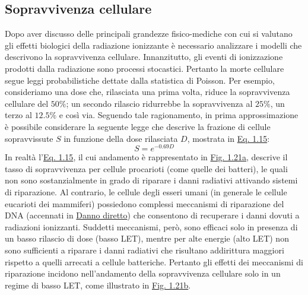 \documentclass[12pt,a4paper,twoside]{report}
\begin{document}
	\subsection{Sopravvivenza cellulare}\label{sec:sopravvivenza_cellulare}
	Dopo aver discusso delle principali grandezze fisico-mediche con cui si valutano gli effetti biologici della radiazione ionizzante è necessario analizzare i modelli che descrivono la sopravvivenza cellulare. Innanzitutto, gli eventi di ionizzazione prodotti dalla radiazione sono processi stocastici. Pertanto la morte cellulare segue leggi probabilistiche dettate dalla statistica di Poisson. Per esempio, consideriamo una dose che, rilasciata una prima volta, riduce la sopravvivenza cellulare del $50\%$; un secondo rilascio ridurrebbe la sopravvivenza al $25\%$, un terzo al $12.5\%$ e così via. Seguendo tale ragionamento, in prima approssimazione è possibile considerare la seguente legge che descrive la frazione di cellule sopravvissute $S$ in funzione della dose rilasciata $D$, mostrata in \hyperref[eq:survival1]{Eq. 1.15}:
	\begin{equation}
		S=e^{-0.69D}
		\label{eq:survival1}
	\end{equation}
	In realtà l'\hyperref[eq:survival1]{Eq. 1.15}, il cui andamento è rappresentato in \hyperref[fig:survival1]{Fig. 1.21a}, descrive il tasso di sopravvivenza per cellule procarioti (come quelle dei batteri), le quali non sono sostanzialmente in grado di riparare i danni radiativi attivando sistemi di riparazione. Al contrario, le cellule degli esseri umani (in generale le cellule eucarioti dei mammiferi) possiedono complessi meccanismi di riparazione del DNA (accennati in \hyperref[par:danno_diretto]{Danno diretto}) che consentono di recuperare i danni dovuti a radiazioni ionizzanti. Suddetti meccanismi, però, sono efficaci solo in presenza di un basso rilascio di dose (basso LET), mentre per alte energie (alto LET) non sono sufficienti a riparare i danni radiativi che risultano addirittura maggiori rispetto a quelli arrecati a cellule batteriche. Pertanto gli effetti dei meccanismi di riparazione incidono nell'andamento della sopravvivenza cellulare solo in un regime di basso LET, come illustrato in \hyperref[fig:survival2]{Fig. 1.21b}.
	
\end{document}
